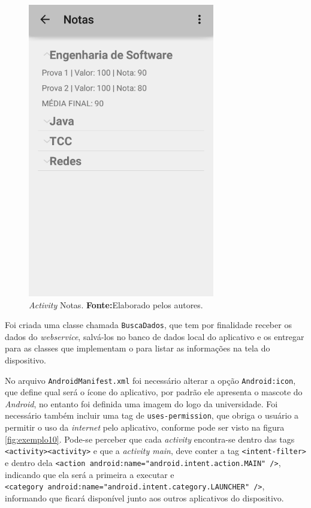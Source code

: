 	\begin{figure}[h!]
			\centerline{\includegraphics[scale=0.5]{./imagens/imagem9.png}}
			\caption[\textit{Activity} Notas]{\textit{Activity} Notas.
			 \textbf{Fonte:}Elaborado pelos autores.}
			\label{fig:exemplo9}
		\end{figure}
		
	\par Foi criada uma classe chamada \texttt{BuscaDados}, que tem por finalidade
receber os dados do \textit{webservice}, salvá-los no banco de dados local do
aplicativo e os entregar para as classes que implementam o 
para listar as informações na tela do dispositivo.
	
	\par No arquivo \texttt{AndroidManifest.xml} foi necessário alterar a opção
\texttt{Android:icon}, que define qual será o ícone do aplicativo, por padrão
ele apresenta o mascote do \textit{Android}, no entanto foi definida uma imagem
do logo da universidade. Foi necessário também incluir uma tag de
\texttt{uses-permission}, que obriga o usuário a permitir o uso da
\textit{internet} pelo aplicativo, conforme pode ser visto na figura
\ref{fig:exemplo10}. Pode-se perceber que cada \textit{activity} encontra-se
dentro das tags \texttt{<activity><\/activity>} e que a \textit{activity main},
deve conter a tag \texttt{<intent-filter>} e dentro dela \texttt{<action
android:name="android.intent.action.MAIN" />}, indicando que ela será a
primeira a executar e \\\texttt{<category
android:name="android.intent.category.LAUNCHER" />}, informando que ficará
disponível junto aos outros aplicativos do dispositivo.
	

